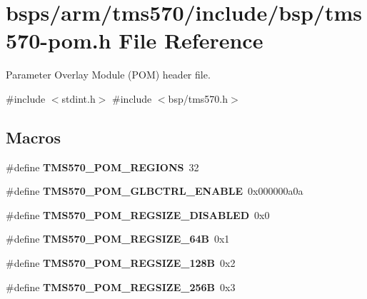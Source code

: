 \hypertarget{tms570-pom_8h}{}\section{bsps/arm/tms570/include/bsp/tms570-\/pom.h File Reference}
\label{tms570-pom_8h}


Parameter Overlay Module (P\+OM) header file.  


{\ttfamily \#include $<$stdint.\+h$>$}\newline
{\ttfamily \#include $<$bsp/tms570.\+h$>$}\newline
\subsection*{Macros}
\begin{DoxyCompactItemize}
\item 
\mbox{\label{tms570-pom_8h_a0acc46e35277293c7bb8846eff6c229b}} 
\#define {\bfseries T\+M\+S570\+\_\+\+P\+O\+M\+\_\+\+R\+E\+G\+I\+O\+NS}~32
\item 
\mbox{\label{tms570-pom_8h_a1b989281b79e739c4e96eac2744ae80e}} 
\#define {\bfseries T\+M\+S570\+\_\+\+P\+O\+M\+\_\+\+G\+L\+B\+C\+T\+R\+L\+\_\+\+E\+N\+A\+B\+LE}~0x000000a0a
\item 
\mbox{\label{tms570-pom_8h_aecc9cb93f57a46b849742661c33d460d}} 
\#define {\bfseries T\+M\+S570\+\_\+\+P\+O\+M\+\_\+\+R\+E\+G\+S\+I\+Z\+E\+\_\+\+D\+I\+S\+A\+B\+L\+ED}~0x0
\item 
\mbox{\label{tms570-pom_8h_a9be6fd9388aa6279457bcfe2f7f931e5}} 
\#define {\bfseries T\+M\+S570\+\_\+\+P\+O\+M\+\_\+\+R\+E\+G\+S\+I\+Z\+E\+\_\+64B}~0x1
\item 
\mbox{\label{tms570-pom_8h_a1b7a148ff9cfe4da51d2b6d5c5d10be4}} 
\#define {\bfseries T\+M\+S570\+\_\+\+P\+O\+M\+\_\+\+R\+E\+G\+S\+I\+Z\+E\+\_\+128B}~0x2
\item 
\mbox{\label{tms570-pom_8h_a245a86a2fce07fab9dd31bca9fe598ce}} 
\#define {\bfseries T\+M\+S570\+\_\+\+P\+O\+M\+\_\+\+R\+E\+G\+S\+I\+Z\+E\+\_\+256B}~0x3
\item 
\mbox{\label{tms570-pom_8h_a8bdd92ddadc8b9adfd09ba47cee57588}} 

\end{DoxyCompactItemize}
